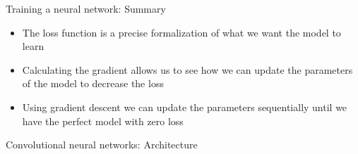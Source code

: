 \documentclass[t]{beamer}
\begin{document}
	\begin{frame}{Training a neural network: Summary}
		\centering
		\vfill
		\begin{itemize}
			\item The loss function is a precise formalization of what we want the model to learn
			\item Calculating the gradient allows us to see how we can update the parameters of the model to decrease the loss
			\item Using gradient descent we can update the parameters sequentially until we have the perfect model with zero loss
		\end{itemize}
		\vfill
	\end{frame}

	\begin{frame}{Convolutional neural networks: Architecture}
		\centering
		\vfill
\end{frame}
\end{document}

